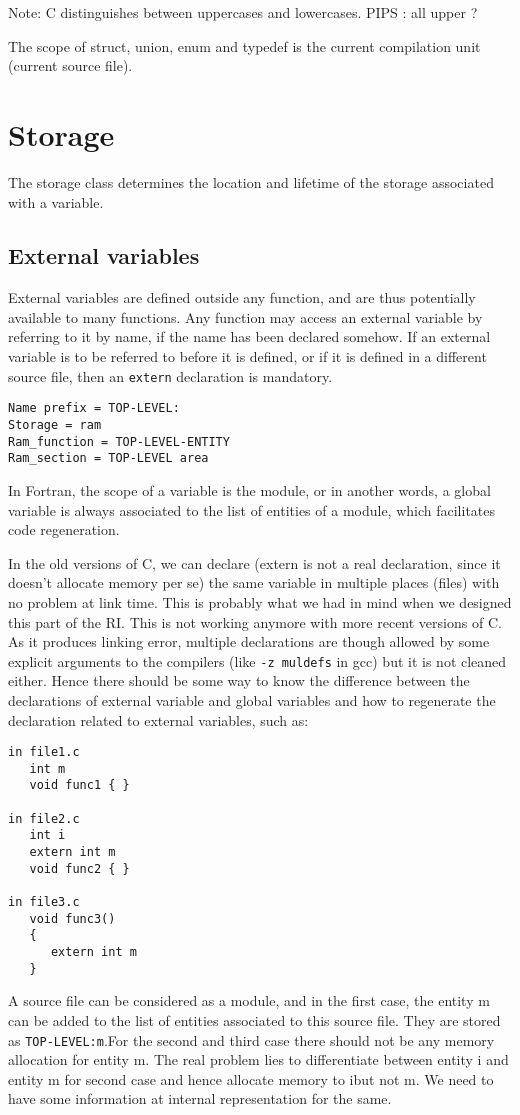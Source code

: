 \documentclass[a4paper]{article}
\begin{document}
Note: C distinguishes between uppercases and lowercases. PIPS : all upper
? 
 
The scope of struct, union, enum and typedef is the current compilation
unit (current source file).
 
\newpage
\section{Storage}
The storage class determines the location and lifetime of the storage
associated with a variable. 
\subsection{External variables}
\label{external}
External variables are defined outside any function, and are thus
potentially available to many functions. Any function may access an
external variable by referring to it by name, if the name has been
declared somehow. If an external variable is to be referred to before it
is defined, or if it is defined in a different source file, then an
\verb/extern/ declaration is mandatory. 
\begin{verbatim}
Name prefix = TOP-LEVEL:
Storage = ram 
Ram_function = TOP-LEVEL-ENTITY 
Ram_section = TOP-LEVEL area 
\end{verbatim}
In Fortran, the scope of a variable is the module, or in another words, 
a global variable is always associated to the list of entities
of a module, which facilitates code regeneration. 

In the old versions of C, we can declare (extern is not a real declaration, 
since it doesn't allocate memory per se) the same variable in multiple places 
(files) with no problem at link time. This is probably what we had in mind 
when we designed this part of the RI. 
This is not working anymore with more recent versions of C. As it produces 
linking error, multiple declarations are though allowed by some explicit 
arguments to the compilers (like \verb /-z muldefs/ in gcc) but it is not
cleaned either. Hence there should be some way to know the difference between
the declarations of external variable and global variables and how to 
regenerate the declaration related to external variables, such as:

\begin{verbatim}
in file1.c
   int m
   void func1 { }

in file2.c 
   int i
   extern int m 
   void func2 { }

in file3.c
   void func3() 
   { 
      extern int m
   } 
\end{verbatim}
A source file can be considered as a module, and in the first case, the
entity m can be added to the list of entities associated to this source
file. They are stored as \verb /TOP-LEVEL:m/.For the second and third case 
there should not be any memory allocation for entity m. The real problem lies 
to differentiate between entity i and entity m for second case and hence 
allocate memory to ibut not m. We need to have some information at internal 
representation for the same.
\end{document}
